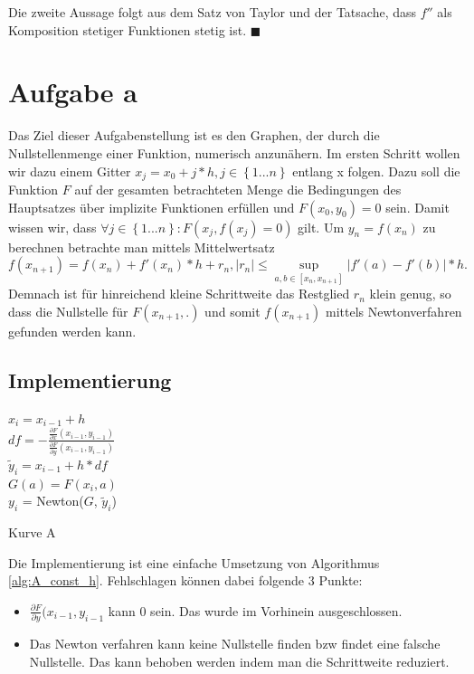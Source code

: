 \documentclass[a4paper,11pt,bibliography=totoc,listof=totoc,headinclude=true,cleardoublepage=empty,oneside]{scrartcl}
\newcommand{\diff}[2]{\frac{\partial #1}{\partial #2}}
\newcounter{satz}
\begin{document}
Die zweite Aussage folgt aus dem Satz von Taylor und der Tatsache, dass $f''$ als Komposition stetiger Funktionen stetig ist. \hfill $\blacksquare$

\section{Aufgabe a}
Das Ziel dieser Aufgabenstellung ist es den Graphen, der durch die Nullstellenmenge einer Funktion, numerisch anzunähern. Im ersten Schritt wollen wir dazu einem Gitter $x_j = x_0 + j*h, j \in \left\lbrace1...n\right\rbrace $ entlang x folgen. 
Dazu soll die Funktion $F$ auf der gesamten betrachteten Menge die Bedingungen des Hauptsatzes über implizite Funktionen erfüllen und $F(x_0,y_0)=0$ sein. Damit wissen wir, dass $\forall j \in \left\lbrace1...n\right\rbrace: F(x_j,f(x_j)=0)$ gilt. Um $y_n = f(x_n)$ zu berechnen betrachte man mittels Mittelwertsatz
\[
f(x_{n+1})=f(x_n)+f'(x_n)*h+r_n, \left|r_n\right|\leq \sup\limits_{a,b \in \left[x_n,x_{n+1}\right]}\left|{f'(a)-f'(b)}\right|*h.
\]
Demnach ist für hinreichend kleine Schrittweite das Restglied $r_n$ klein genug, so dass die Nullstelle für $F(x_{n+1},.)$ und somit $f(x_{n+1})$ mittels Newtonverfahren gefunden werden kann.

\subsection{Implementierung}
\begin{algorithm}
	\label{alg:A_const_h}
	{
		$x_i = x_{i-1}+h$\\
		$df = -\frac{\diff{F}{x}(x_{i-1},y_{i-1})}{\diff{F}{y}(x_{i-1},y_{i-1})}$\\
		$\tilde y_i = x_{i-1}+h*df$\\
		$G(a) = F(x_i,a)$\\
		$y_i$ = Newton($G$, $\tilde y_i$)
	}
	\caption{Kurve A}
\end{algorithm}
Die Implementierung ist eine einfache Umsetzung von Algorithmus \ref{alg:A_const_h}.
Fehlschlagen können dabei folgende 3 Punkte:
\begin{itemize}
	\item $\diff{F}{y}(x_{i-1},y_{i-1}$ kann 0 sein. Das wurde im Vorhinein ausgeschlossen.
	\item Das Newton verfahren kann keine Nullstelle finden bzw findet eine falsche Nullstelle. Das kann behoben werden indem man die Schrittweite reduziert.
\end{itemize}
\end{document}
